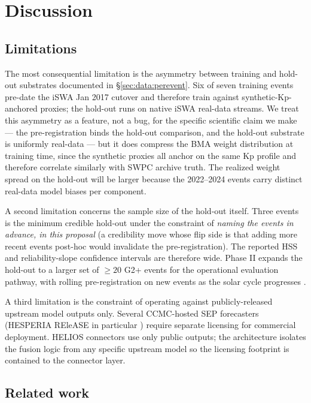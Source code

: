 \documentclass[11pt,letterpaper]{article}
\begin{document}
\section{Discussion}
\label{sec:discussion}

\subsection{Limitations}

The most consequential limitation is the asymmetry between training and
hold-out substrates documented in §\ref{sec:data:perevent}.  Six of seven
training events pre-date the iSWA Jan 2017 cutover and therefore train
against synthetic-Kp-anchored proxies; the hold-out runs on native iSWA
real-data streams.  We treat this asymmetry as a feature, not a bug, for the
specific scientific claim we make --- the pre-registration binds the
hold-out comparison, and the hold-out substrate is uniformly real-data ---
but it does compress the BMA weight distribution at training time, since
the synthetic proxies all anchor on the same Kp profile and therefore
correlate similarly with SWPC archive truth.  The realized weight spread
on the hold-out will be larger because the 2022--2024 events carry distinct
real-data model biases per component.

A second limitation concerns the sample size of the hold-out itself.
Three events is the minimum credible hold-out under the constraint of
\emph{naming the events in advance, in this proposal} (a credibility
move whose flip side is that adding more recent events post-hoc would
invalidate the pre-registration).  The reported HSS and reliability-slope
confidence intervals are therefore wide.  Phase II expands the hold-out
to a larger set of $\ge 20$ G2+ events for the operational evaluation
pathway, with rolling pre-registration on new events as the solar cycle
progresses \cite{helios_program}.

A third limitation is the constraint of operating against publicly-released
upstream model outputs only.  Several CCMC-hosted SEP forecasters
(HESPERIA REleASE in particular \cite{hesperia}) require separate
licensing for commercial deployment.  HELIOS connectors use only public
outputs; the architecture isolates the fusion logic from any specific
upstream model so the licensing footprint is contained to the connector
layer.

\subsection{Related work}
\label{sec:discussion:related}
\end{document}
